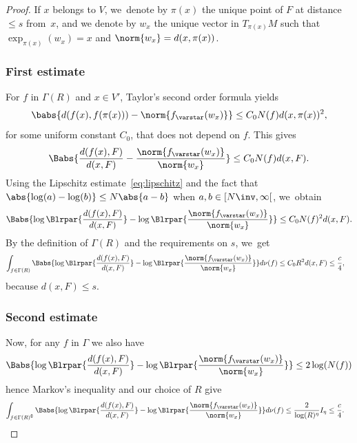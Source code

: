 \begin{proof}
If $x$ belongs to $V$, we~denote by $\pi(x)$ the unique point of $F$ at distance $\leq s$ from~$x$, and we denote by $w_x$ the unique vector in $T_{\pi(x)}M$ such that $\exp_{\pi(x)}(w_x)=x$ and $\norm{w_x}=d(x,\pi(x))$.

\subsubsection*{First estimate}
For $f$ in $\Gamma(R)$ and $x\in V'$, Taylor's second order formula yields
\begin{equation}\label{eq:Taylor}
\babs{d(f(x),f(\pi(x))) - \norm{f_\varstar (w_x)}}\leq C_0 N(f)d(x, \pi(x))^2,
\end{equation}
for some uniform constant $C_0$, that does not depend on $f$. This gives
\begin{equation*}
\Babs{\frac{d(f(x),F)}{d(x, F)} - \frac{\norm{f_\varstar (w_x)}}{\norm{w_x}}} \leq C_0 N(f) d(x,F).
\end{equation*}
Using the Lipschitz estimate~\eqref{eq:lipschitz} and the fact that $\abs{\log(a) -\log(b)}\leq N\abs{a-b}$ when $a, b\in [N\inv,\infty[$, we~obtain
\begin{equation}\label{eq:delta_1}
\Babs{\log\Blrpar{\frac{d(f(x),F)}{d(x, F)}} - \log\Blrpar{\frac{\norm{f_\varstar (w_x)}}{\norm{w_x}}}} \leq C_0 N(f)^2 d(x,F).
\end{equation}
By the definition of $\Gamma(R)$ and the requirements on $s$, we~get
\begin{align*}
\int_{f\in \Gamma(R)} \Babs{\log\Blrpar{\frac{d(f(x),F)}{d(x, F)}}- \log\Blrpar{\frac{\norm{f_\varstar (w_x)}}{\norm{w_x}}}} d\nu(f) & \leq C_0 R^2 d(x,F) \leq \frac{c}{4},
\end{align*}
because $d(x,F)\leq s$.

\subsubsection*{Second estimate}
Now, for any $f$ in $\Gamma$ we also have
\begin{equation}\label{eq:lipschitz_log_ratio_estimate}
\Babs{\log\Blrpar{\frac{d(f(x),F)}{d(x, F)}} - \log\Blrpar{\frac{\norm{f_\varstar (w_x)}}{\norm{w_x}}}} \leq 2\log(N(f))
\end{equation}
hence Markov's inequality and our choice of $R$ give
\begin{align*}
\int_{f\in \Gamma(R)^\complement} \Babs{\log\Blrpar{\frac{d(f(x),F)}{d(x, F)}} - \log\Blrpar{\frac{\norm{f_\varstar (w_x)}}{\norm{w_x}}}} d\nu(f)& \leq \frac{2}{\log(R)^\eta}I_\eta \leq \frac{c}{4}.
\end{align*}


\end{proof}
